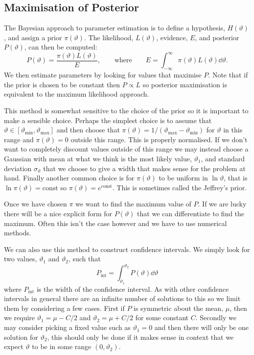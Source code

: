\documentclass[a4paper]{article}
\begin{document}
    \subsection{Maximisation of Posterior}
    The Bayesian approach to parameter estimation is to define a hypothesis, \(H(\vartheta)\), and assign a prior \(\pi(\vartheta)\).
    The likelihood, \(L(\vartheta)\), evidence, \(E\), and posterior \(P(\vartheta)\), can then be computed:
    \[P(\vartheta) = \frac{\pi(\vartheta)L(\vartheta)}{E}, \qquad\text{where}\qquad E = \int_{-\infty}^{\infty} \pi(\vartheta)L(\vartheta) \dd{\vartheta}.\]
    We then estimate parameters by looking for values that maximise \(P\).
    Note that if the prior is chosen to be constant then \(P \propto L\) so posterior maximisation is equivalent to the maximum likelihood approach.
    
    This method is somewhat sensitive to the choice of the prior so it is important to make a sensible choice.
    Perhaps the simplest choice is to assume that \(\vartheta\in[\vartheta_{\min}, \vartheta_{\max}]\) and then choose that \(\pi(\vartheta) = 1/(\vartheta_{\max} - \vartheta_{\min})\) for \(\vartheta\) in this range and \(\pi(\vartheta) = 0\) outside this range.
    This is properly normalised.
    If we don't want to completely discount values outside of this range we may instead choose a Gaussian with mean at what we think is the most likely value, \(\vartheta_1\), and standard deviation \(\sigma_\vartheta\) that we choose to give a width that makes sense for the problem at hand.
    Finally another common choice is for \(\pi(\vartheta)\) to be uniform in \(\ln\vartheta\), that is \(\ln\pi(\vartheta) = \text{const}\) so \(\pi(\vartheta) = e^{\text{const}}\).
    This is sometimes called the Jeffrey's prior.
    
    Once we have chosen \(\pi\) we want to find the maximum value of \(P\).
    If we are lucky there will be a nice explicit form for \(P(\vartheta)\) that we can differentiate to find the maximum.
    Often this isn't the case however and we have to use numerical methods.
    
    We can also use this method to construct confidence intervals.
    We simply look for two values, \(\vartheta_1\) and \(\vartheta_2\), such that 
    \[P_{\mathrm{int}} = \int_{\vartheta_1}^{\vartheta_2} P(\vartheta) \dd{\vartheta}\]
    where \(P_{\mathrm{int}}\) is the width of the confidence interval.
    As with other confidence intervals in general there are an infinite number of solutions to this so we limit them by considering a few cases.
    First if \(P\) is symmetric about the mean, \(\mu\), then we require \(\vartheta_1 = \mu - C/2\) and \(\vartheta_2 = \mu + C/2\) for some constant \(C\).
    Secondly we may consider picking a fixed value such as \(\vartheta_1 = 0\) and then there will only be one solution for \(\vartheta_2\), this should only be done if it makes sense in context that we expect \(\vartheta\) to be in some range \((0, \vartheta_2)\).
    
\end{document}
